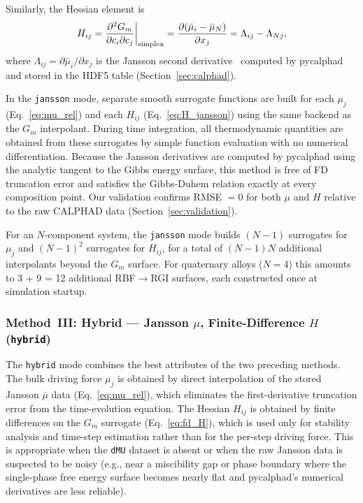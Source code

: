 Similarly, the Hessian element is
\begin{equation}
  H_{ij}
  = \frac{\partial^2 G_m}{\partial c_i \partial c_j}\bigg|_{\rm simplex}
  = \frac{\partial(\bar{\mu}_i - \bar{\mu}_N)}{\partial x_j}
  = \Lambda_{ij} - \Lambda_{Nj},
  \label{eq:H_jansson}
\end{equation}
where $\Lambda_{ij} = \partial\bar{\mu}_i/\partial x_j$ is the
Jansson second derivative~\cite{jansson1984} computed by pycalphad
and stored in the HDF5 table (Section~\ref{sec:calphad}).

In the \texttt{jansson} mode, separate smooth surrogate functions are
built for each $\mu_j$ (Eq.~\ref{eq:mu_rel}) and each $H_{ij}$
(Eq.~\ref{eq:H_jansson}) using the same backend as the $G_m$
interpolant.  During time integration, all thermodynamic quantities
are obtained from these surrogates by simple function evaluation with
no numerical differentiation.  Because the Jansson derivatives are
computed by pycalphad using the analytic tangent to the Gibbs energy
surface, this method is free of FD truncation error and satisfies the
Gibbs-Duhem relation exactly at every composition point.  Our
validation confirms RMSE $= 0$ for both $\mu$ and $H$ relative to
the raw CALPHAD data (Section~\ref{sec:validation}).

For an $N$-component system, the \texttt{jansson} mode builds
$(N-1)$ surrogates for $\mu_j$ and $(N-1)^2$ surrogates for
$H_{ij}$, for a total of $(N-1)N$ additional interpolants
beyond the $G_m$ surface.  For quaternary alloys ($N=4$) this
amounts to 3 + 9 = 12 additional RBF$\to$RGI surfaces, each
constructed once at simulation startup.

\subsubsection{Method~III: Hybrid — Jansson $\mu$, Finite-Difference $H$ (\texttt{hybrid})}
\label{sec:hybrid}

The \texttt{hybrid} mode combines the best attributes of the two
preceding methods.  The bulk driving force $\mu_j$ is obtained by
direct interpolation of the stored Jansson $\bar{\mu}$ data
(Eq.~\ref{eq:mu_rel}), which eliminates the first-derivative
truncation error from the time-evolution equation.  The Hessian
$H_{ij}$ is obtained by finite differences on the $G_m$ surrogate
(Eq.~\ref{eq:fd_H}), which is used only for stability analysis and
time-step estimation rather than for the per-step driving force.
This is appropriate when the \texttt{dMU} dataset is absent or when
the raw Jansson data is suspected to be noisy (e.g., near a
miscibility gap or phase boundary where the single-phase free energy
surface becomes nearly flat and pycalphad's numerical derivatives are
less reliable).

